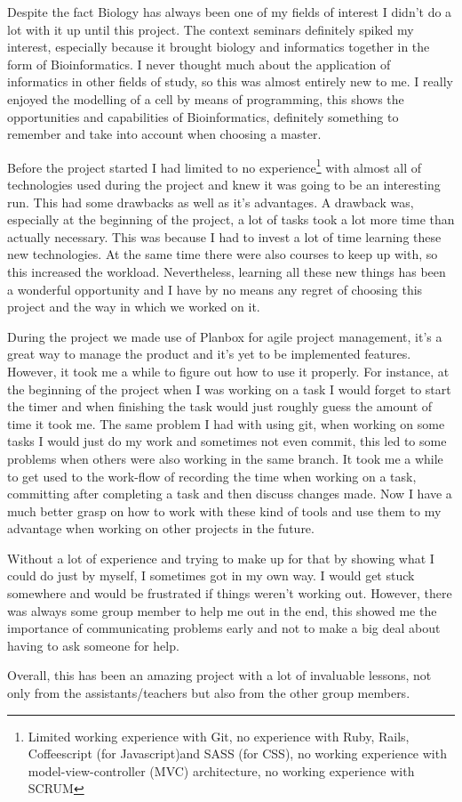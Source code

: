 Despite the fact Biology has always been one of my fields of interest I didn't do a lot with it up until this project. The context seminars definitely spiked my interest, especially because it brought biology and informatics together in the form of Bioinformatics. I never thought much about the application of informatics in other fields of study, so this was almost entirely new to me. I really enjoyed the modelling of a cell by means of programming, this shows the opportunities and capabilities of Bioinformatics, definitely something to remember and take into account when choosing a master.

Before the project started I had limited to no experience\footnote{Limited working experience with Git, no experience with Ruby, Rails, Coffeescript (for Javascript)and SASS (for CSS), no working experience with model-view-controller (MVC) architecture, no working experience with SCRUM} with almost all of technologies used during the project and knew it was going to be an interesting run. This had some drawbacks as well as it's advantages. A drawback was, especially at the beginning of the project, a lot of tasks took a lot more time than actually necessary. This was because I had to invest a lot of time learning these new technologies. At the same time there were also courses to keep up with, so this increased the workload. Nevertheless, learning all these new things has been a wonderful opportunity and I have by no means any regret of choosing this project and the way in which we worked on it.

During the project we made use of Planbox for agile project management, it's a great way to  manage the product and it's yet to be implemented features. However, it took me a while to figure out how to use it properly. For instance, at the beginning of the project when I was working on a task I would forget to start the timer and when finishing the task would just roughly guess the amount of time it took me. The same problem I had with using git, when working on some tasks I would just do my work and sometimes not even commit, this led to some problems when others were also working in the same branch. It took me a while to get used to the work-flow of recording the time when working on a task, committing after completing a task and then discuss changes made. Now I have a much better grasp on how to work with these kind of tools and use them to my advantage when working on other projects in the future.

Without a lot of experience and trying to make up for that by showing what I could do just by myself, I sometimes got in my own way. I would get stuck somewhere and would be frustrated if things weren't working out. However, there was always some group member to help me out in the end, this showed me the importance of communicating problems early and not to make a big deal about having to ask someone for help.

Overall, this has been an amazing project with a lot of invaluable lessons, not only from the assistants/teachers but also from the other group members.\\
